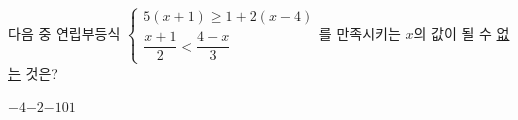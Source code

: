 다음 중 연립부등식 $\begin{cases} 5(x+1)\ge 1+2(x-4) \\[2pt] \dfrac{x+1}{2}<\dfrac{4-x}{3} \end{cases}$를 만족시키는 $x$의 값이 될 수 \underline{없는} 것은?
\begin{choices32}{$-4$}{$-2$}{$-1$}{$0$}{$1$}\end{choices32}
